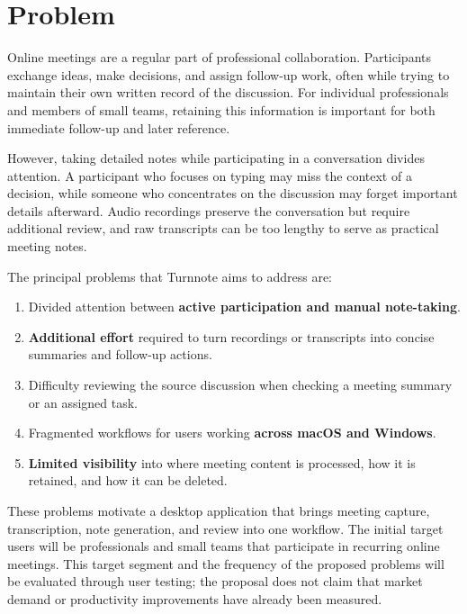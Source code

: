 \documentclass[12pt,a4paper]{article}
\begin{document}
\section*{Problem}
Online meetings are a regular part of professional collaboration. Participants exchange ideas, make decisions, and assign follow-up work, often while trying to maintain their own written record of the discussion. For individual professionals and members of small teams, retaining this information is important for both immediate follow-up and later reference.\par
However, taking detailed notes while participating in a conversation divides attention. A participant who focuses on typing may miss the context of a decision, while someone who concentrates on the discussion may forget important details afterward. Audio recordings preserve the conversation but require additional review, and raw transcripts can be too lengthy to serve as practical meeting notes.\par
The principal problems that Turnnote aims to address are:\par
\begin{enumerate}
\item Divided attention between \textbf{active participation and manual note-taking}.
\item \textbf{Additional effort} required to turn recordings or transcripts into concise summaries and follow-up actions.
\item Difficulty reviewing the source discussion when checking a meeting summary or an assigned task.
\item Fragmented workflows for users working \textbf{across macOS and Windows}.
\item \textbf{Limited visibility} into where meeting content is processed, how it is retained, and how it can be deleted.
\end{enumerate}
These problems motivate a desktop application that brings meeting capture, transcription, note generation, and review into one workflow. The initial target users will be professionals and small teams that participate in recurring online meetings. This target segment and the frequency of the proposed problems will be evaluated through user testing; the proposal does not claim that market demand or productivity improvements have already been measured.\par
{}
\end{document}

